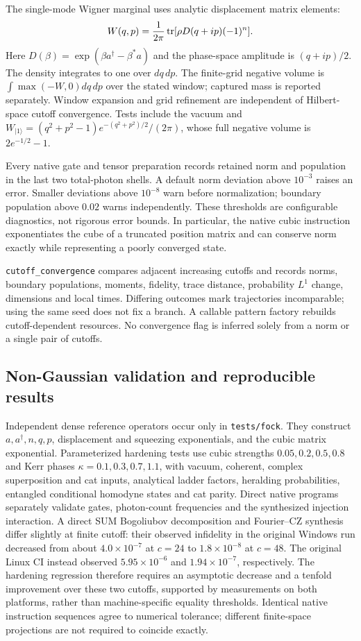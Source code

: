 The single-mode Wigner marginal uses analytic displacement matrix elements:
\begin{equation}
 W(q,p)=\frac{1}{2\pi}\operatorname{tr}[\rho D(q+ip)(-1)^n].
\end{equation}
Here $D(\beta)=\exp(\beta a^\dagger-\beta^*a)$ and the phase-space amplitude
is $(q+ip)/2$. The density integrates to one over $dq\,dp$. The finite-grid
negative volume is $\int\max(-W,0)dq\,dp$ over the stated window; captured mass
is reported separately. Window expansion and grid refinement are independent
of Hilbert-space cutoff convergence. Tests include the vacuum and
$W_{|1\rangle}=(q^2+p^2-1)e^{-(q^2+p^2)/2}/(2\pi)$, whose full negative volume
is $2e^{-1/2}-1$.

Every native gate and tensor preparation records retained norm and population
in the last two total-photon shells. A default norm deviation above $10^{-3}$
raises an error. Smaller deviations above $10^{-8}$ warn before normalization;
boundary population above $0.02$ warns independently. These thresholds are
configurable diagnostics, not rigorous error bounds. In particular, the native
cubic instruction exponentiates the cube of a truncated position matrix and
can conserve norm exactly while representing a poorly converged state.

\texttt{cutoff\_convergence} compares adjacent increasing cutoffs and records
norms, boundary populations, moments, fidelity, trace distance, probability
$L^1$ change, dimensions and local times. Differing outcomes mark trajectories
incomparable; using the same seed does not fix a branch. A callable pattern
factory rebuilds cutoff-dependent resources. No convergence flag is inferred
solely from a norm or a single pair of cutoffs.

\subsection{Non-Gaussian validation and reproducible results}

Independent dense reference operators occur only in \texttt{tests/fock}.
They construct $a,a^\dagger,n,q,p$, displacement and squeezing exponentials,
and the cubic matrix exponential. Parameterized hardening tests use cubic strengths
$0.05,0.2,0.5,0.8$ and Kerr phases $\kappa=0.1,0.3,0.7,1.1$, with vacuum,
coherent, complex superposition and cat inputs, analytical ladder factors,
heralding probabilities, entangled conditional homodyne states and cat parity.
Direct native programs separately validate gates, photon-count frequencies and
the synthesized injection interaction. A direct SUM Bogoliubov decomposition
and Fourier--CZ synthesis differ slightly at finite cutoff: their observed
infidelity in the original Windows run decreased from about $4.0\times10^{-7}$
at $c=24$ to $1.8\times10^{-8}$ at $c=48$. The original Linux CI instead
observed $5.95\times10^{-6}$ and $1.94\times10^{-7}$, respectively.
The hardening regression therefore requires an asymptotic decrease and a
tenfold improvement over these two cutoffs, supported by measurements on both
platforms, rather than machine-specific equality thresholds. Identical native
instruction sequences agree to numerical tolerance; different finite-space
projections are not required to coincide exactly.

